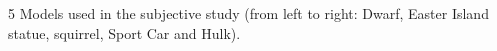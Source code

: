 5 Models used in the subjective study (from left to right: Dwarf, Easter Island statue, squirrel, Sport Car and Hulk).